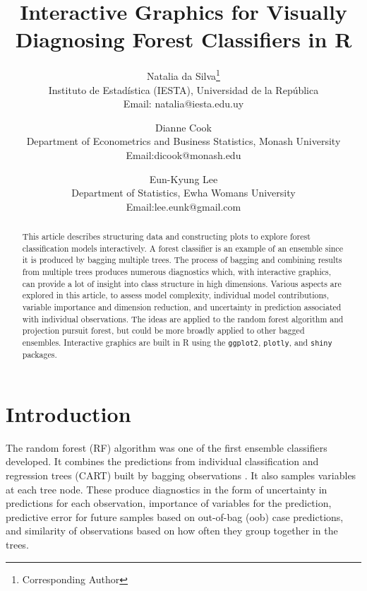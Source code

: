 \documentclass[10pt, legalpaper, twoside]{article}\usepackage[]{graphicx}\usepackage[]{color}
\title{Interactive Graphics for Visually Diagnosing Forest Classifiers in R}
\author{Natalia da Silva\thanks{Corresponding Author}  \\
	    Instituto de Estad\'istica (IESTA), Universidad de la Rep\'ublica\\ Email:  natalia@iesta.edu.uy\\
	\and 
	Dianne Cook \\
	Department of Econometrics and Business Statistics, Monash University\\ Email:dicook@monash.edu \\
		\and 
		Eun-Kyung Lee\\
		Department of Statistics,  Ewha Womans University \\
		Email:lee.eunk@gmail.com
	}
\date{}
\begin{document}
\maketitle

\begin{abstract}
This article describes structuring data and constructing plots to explore forest classification models interactively. A forest classifier is an example of an ensemble since it is produced by bagging multiple trees. The process of bagging and combining results from multiple trees produces numerous diagnostics which, with interactive graphics, can provide a lot of insight into class structure in high dimensions. Various aspects are explored in this article, to assess model complexity, individual model contributions, variable importance and dimension reduction, and uncertainty in prediction associated with individual observations. The ideas are applied to the random forest algorithm and projection pursuit forest, but could be more broadly applied to other bagged ensembles. Interactive graphics are built in R using the \texttt{ggplot2}, \texttt{plotly}, and \texttt{shiny} packages.
\end{abstract}



\section{Introduction}
The random forest (RF) algorithm \cite{breiman1996bagging} was one of the first ensemble classifiers developed.  It combines the predictions from individual classification and regression trees (CART) \cite{breiman1984cl} built by bagging observations \cite{breiman1996bagging}. It also samples variables at each tree node. These produce diagnostics in the form of uncertainty in predictions for each observation, importance of variables for the prediction, predictive error for future samples based on out-of-bag (oob) case predictions, and similarity of observations based on how often they group together in the trees.
\end{document}
